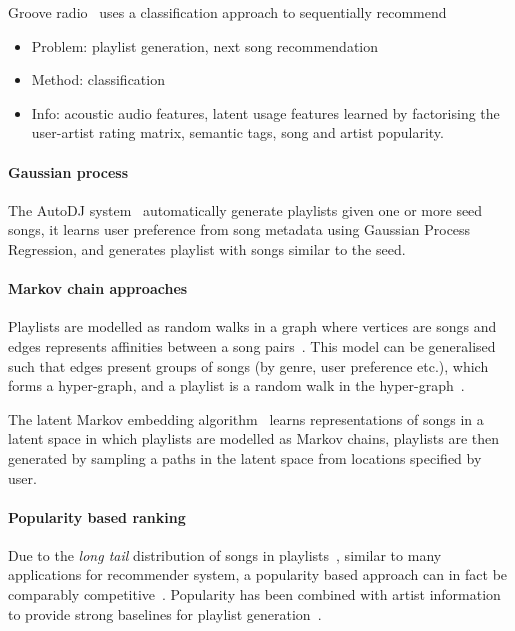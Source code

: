 Groove radio~\cite{ben2017groove} uses a classification approach to sequentially recommend 
\begin{itemize}
\item Problem: playlist generation, next song recommendation
\item Method: classification 
\item Info: acoustic audio features, latent usage features learned by factorising the user-artist rating matrix, semantic tags, song and artist popularity.
\end{itemize}




\paragraph{Gaussian process}
The AutoDJ system~\cite{platt2002learning} automatically generate playlists given one or more seed songs, 
it learns user preference from song metadata using Gaussian Process Regression,
and generates playlist with songs similar to the seed.


\paragraph{Markov chain approaches}
Playlists are modelled as random walks in a graph where vertices are songs 
and edges represents affinities between a song pairs~\cite{mcfee2011natural}.
This model can be generalised such that edges present groups of songs (by genre, user preference etc.),
which forms a hyper-graph, and a playlist is a random walk in the hyper-graph~\cite{mcfee2012hypergraph}.

The latent Markov embedding algorithm~\cite{chen2012playlist}
learns representations of songs in a latent space in which playlists are modelled as Markov chains,
playlists are then generated by sampling a paths in the latent space from locations specified by user.

\paragraph{Popularity based ranking}
Due to the \emph{long tail} distribution of songs in playlists~\cite{aoscar2010music},
similar to many applications for recommender system, 
a popularity based approach can in fact be comparably competitive~\cite{cremonesi2010performance}.
Popularity has been combined with artist information to provide strong baselines 
for playlist generation~\cite{mcfee2012million,bonnin2013evaluating,bonnin2015automated}.

